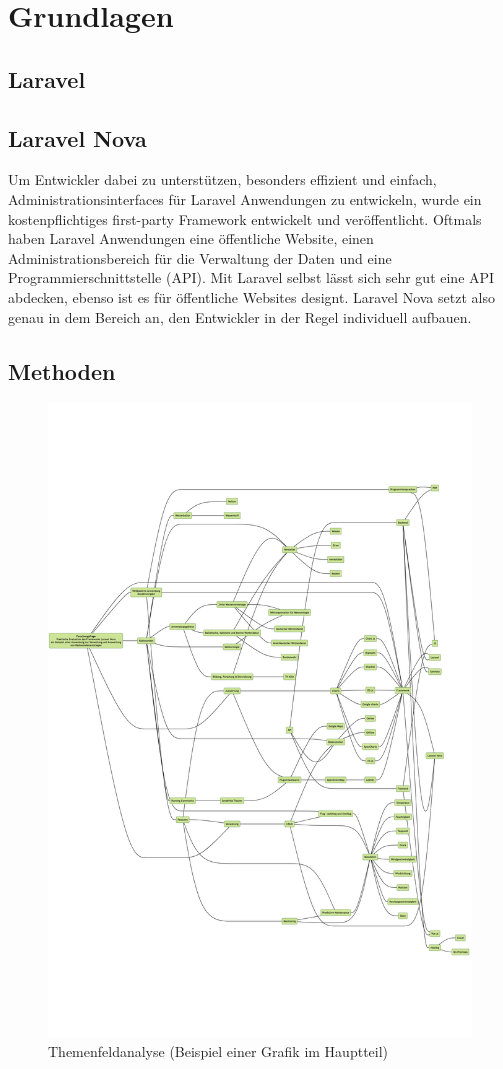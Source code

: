 \newpage


\section{Grundlagen}

\subsection{Laravel}

\subsection{Laravel Nova}
Um Entwickler dabei zu unterstützen, besonders effizient und einfach, Administrationsinterfaces für Laravel Anwendungen zu entwickeln, wurde ein kostenpflichtiges first-party Framework entwickelt und veröffentlicht.\cite{laravel-nova}
Oftmals haben Laravel Anwendungen eine öffentliche Website, einen Administrationsbereich für die Verwaltung der Daten und eine Programmierschnittstelle (API).\cite{laravel-up-and-running}
Mit Laravel selbst lässt sich sehr gut eine API abdecken, ebenso ist es für öffentliche Websites designt.
Laravel Nova setzt also genau in dem Bereich an, den Entwickler in der Regel individuell aufbauen.

\subsection{Methoden}
\begin{figure}[h!]
    \centering
    \caption{Themenfeldanalyse (Beispiel einer Grafik im Hauptteil)}
    \label{fig:themenfeldanalyse}
    \includegraphics[scale=0.23]{images/themenfeldanalyse}
\end{figure}
